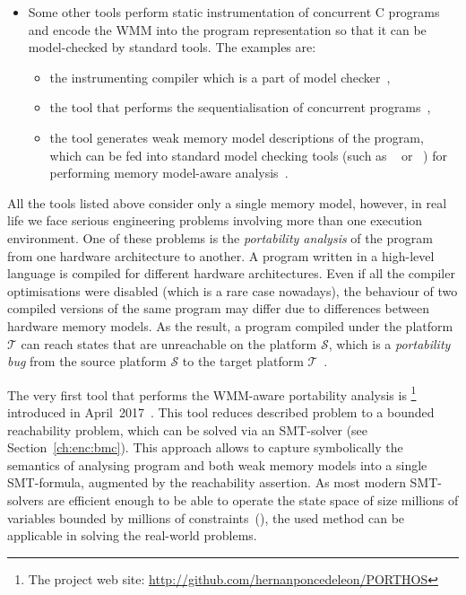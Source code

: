 \begin{itemize}[noitemsep,topsep=0pt,leftmargin=\parindent]
\item Some other tools perform static instrumentation of concurrent C programs and encode the WMM into the program representation so that it can be model-checked by standard tools.
The examples are:
\begin{itemize}[noitemsep,topsep=0pt]
\item the instrumenting compiler  which is a part of  model checker~\cite{kroening2014cbmc},
\item the tool that performs the sequentialisation of concurrent programs~\cite{alglave2013software},
\item the tool  generates weak memory model descriptions of the program, which can be fed into standard model checking tools (such as ~\cite{holzmann1997model} or ~\cite{cimatti2000nusmv}) for performing memory model-aware analysis~\cite{travkin2016verification}.
\end{itemize}

\end{itemize}


All the tools listed above consider only a single memory model, however, in real life we face serious engineering problems involving more than one execution environment.
One of these problems is the \textit{portability analysis} of the program from one hardware architecture to another.
A program written in a high-level language is compiled for different hardware architectures.
Even if all the compiler optimisations were disabled (which is a rare case nowadays), the behaviour of two compiled versions of the same program may differ due to differences between hardware memory models.
As the result, a program compiled under the platform $\mathcal{T}$ can reach states that are unreachable on the platform $\mathcal{S}$, which is a \textit{portability bug} from the source platform $\mathcal{S}$ to the target platform $\mathcal{T}$~\cite{Porthos17a}.

The very first tool that performs the WMM-aware portability analysis is \porthos{}%
%
\footnote{The \porthos{} project web site: \url{http://github.com/hernanponcedeleon/PORTHOS}} %
%
introduced in April~2017~\cite{Porthos17a}.
This tool reduces described problem to a bounded reachability problem, which can be solved via an SMT-solver (see Section~\ref{ch:enc:bmc}).
This approach allows to capture symbolically the semantics of analysing program and both weak memory models into a single SMT-formula, augmented by the reachability assertion.
As most modern SMT-solvers are efficient enough to be able to operate the state space of size millions of variables bounded by millions of constraints~(\cite{malik2009boolean}), the used method can be applicable in solving the real-world problems.

